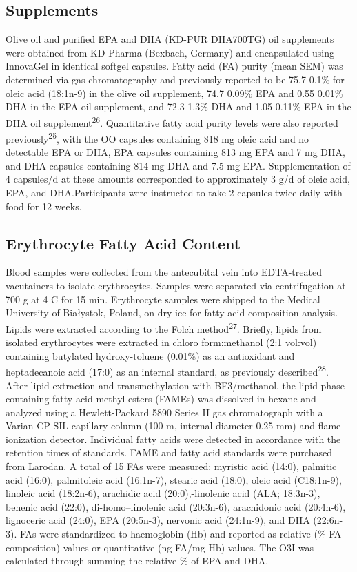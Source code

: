 \documentclass[journal=jacsat,manuscript=article]{achemso}
\begin{document}
\subsection{Supplements}\label{supplements}

Olive oil and purified EPA and DHA (KD-PUR DHA700TG) oil supplements
were obtained from KD Pharma (Bexbach, Germany) and encapsulated using
InnovaGel in identical softgel capsules. Fatty acid (FA) purity (mean
SEM) was determined via gas chromatography and previously reported to be
75.7 0.1\% for oleic acid (18:1n-9) in the olive oil supplement, 74.7
0.09\% EPA and 0.55 0.01\% DHA in the EPA oil supplement, and 72.3 1.3\%
DHA and 1.05 0.11\% EPA in the DHA oil supplement\textsuperscript{26}.
Quantitative fatty acid purity levels were also reported
previously\textsuperscript{25}, with the OO capsules containing 818 mg
oleic acid and no detectable EPA or DHA, EPA capsules containing 813 mg
EPA and 7 mg DHA, and DHA capsules containing 814 mg DHA and 7.5 mg EPA.
Supplementation of 4 capsules/d at these amounts corresponded to
approximately 3 g/d of oleic acid, EPA, and DHA.Participants were
instructed to take 2 capsules twice daily with food for 12 weeks.

\subsection{Erythrocyte Fatty Acid
Content}\label{erythrocyte-fatty-acid-content}

Blood samples were collected from the antecubital vein into EDTA-treated
vacutainers to isolate erythrocytes. Samples were separated via
centrifugation at 700 g at 4 C for 15 min. Erythrocyte samples were
shipped to the Medical University of Białystok, Poland, on dry ice for
fatty acid composition analysis. Lipids were extracted according to the
Folch method\textsuperscript{27}. Briefly, lipids from isolated
erythrocytes were extracted in chloro form:methanol (2:1 vol:vol)
containing butylated hydroxy-toluene (0.01\%) as an antioxidant and
heptadecanoic acid (17:0) as an internal standard, as previously
described\textsuperscript{28}. After lipid extraction and
transmethylation with BF3/methanol, the lipid phase containing fatty
acid methyl esters (FAMEs) was dissolved in hexane and analyzed using a
Hewlett-Packard 5890 Series II gas chromatograph with a Varian CP-SIL
capillary column (100 m, internal diameter 0.25 mm) and flame-ionization
detector. Individual fatty acids were detected in accordance with the
retention times of standards. FAME and fatty acid standards were
purchased from Larodan. A total of 15 FAs were measured: myristic acid
(14:0), palmitic acid (16:0), palmitoleic acid (16:1n-7), stearic acid
(18:0), oleic acid (C18:1n-9), linoleic acid (18:2n-6), arachidic acid
(20:0),-linolenic acid (ALA; 18:3n-3), behenic acid (22:0),
di-homo--linolenic acid (20:3n-6), arachidonic acid (20:4n-6),
lignoceric acid (24:0), EPA (20:5n-3), nervonic acid (24:1n-9), and DHA
(22:6n-3). FAs were standardized to haemoglobin (Hb) and reported as
relative (\% FA composition) values or quantitative (ng FA/mg Hb)
values. The O3I was calculated through summing the relative \% of EPA
and DHA.
\end{document}
